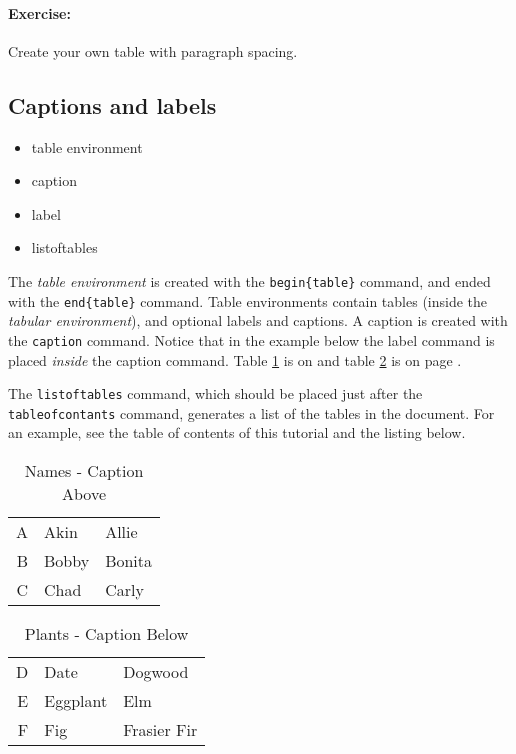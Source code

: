         \paragraph{Exercise:} Create your own table with paragraph spacing.

        \subsection{Captions and labels}
        \label{Captions and labels}
        
        \begin{framed}
            \begin{itemize}
                \item{table environment}
                \item{caption}
                \item{label}
                \item{listoftables}
            \end{itemize}
        \end{framed}

        The \textit{table environment} is created with the \texttt{begin\{table\}} command, and ended with the \texttt{end\{table\}} command. Table environments contain tables (inside the \textit{tabular environment}), and optional labels and captions. A caption is created with the \texttt{caption} command. Notice that in the example below the label command is placed \textit{inside} the caption command. Table \ref{Names} is on  and table \ref{Plants} is on page \pageref{Plants}.

        The \texttt{listoftables} command, which should be placed just after the \texttt{tableofcontants} command, generates a list of the tables in the document. For an example, see the table of contents of this tutorial and the listing below.

    \begin{table}
        \caption{Names - Caption Above \label{Names}}
        \begin{tabular}{r | l l}
            \hline
            A & Akin & Allie \\
            B & Bobby & Bonita \\
            C & Chad & Carly \\
            \hline
        \end{tabular}
    \end{table}
    \begin{table}
        \begin{tabular}{r | l l}
            \hline
            D & Date & Dogwood  \\
            E & Eggplant & Elm \\
            F & Fig & Frasier Fir \\
            \hline
        \end{tabular}
        \caption{Plants - Caption Below \label{Plants}}
    \end{table}

